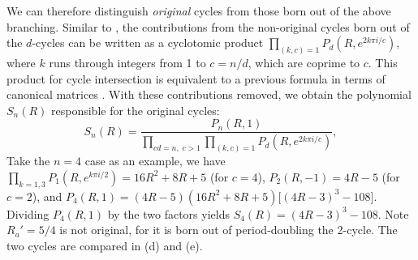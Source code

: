 \documentclass{ws-ijbc}
\begin{document}
We can therefore distinguish \emph{original} cycles
  from those born out of the above branching.
Similar to ,
  the contributions from the non-original cycles
  born out of the $d$-cycles
  can be written as a cyclotomic product
  $\prod_{(k, c) = 1}
      P_{d}
        \left(
          R, e^{2k\pi i/c}
        \right)$,
where $k$ runs through integers from 1 to $c=n/d$,
  which are coprime to $c$.
%
This product for cycle intersection is equivalent to a previous
  formula in terms of canonical matrices \cite{blackhurst}.
%
With these contributions removed,
  we obtain the polynomial $S_n(R)$ responsible for the original cycles:
  \begin{equation}
    S_n(R)
    = \frac
    {
      P_n(R, 1)
    }
    {
      \prod_{c d =  n, \; c > 1}
        \prod_{(k, c) = 1}
      P_{d}
        \left(
          R, e^{2k\pi i/c}
        \right)
    },
  \label{eq:origfac}
  \end{equation}
%
%
%
Take the $n = 4$ case as an example, we have
$\prod_{k=1,3} P_1(R, e^{k\pi i/2})
=16R^2+8R+5$
(for $c = 4$),
$P_2(R, -1) = 4R - 5$
(for $c = 2$),
and
$P_4(R, 1)
= (4R - 5) (16 R^2 + 8 R + 5)
  \bigl[
    (4R - 3)^3 - 108
  \bigr]$.
Dividing $P_4(R, 1)$ by the two factors yields
$S_4(R) = (4R-3)^3 - 108$.
Note $R_a' = 5/4$ is not original,
  for it is born out of period-doubling the 2-cycle.
The two cycles are compared in (d) and (e).
\end{document}
